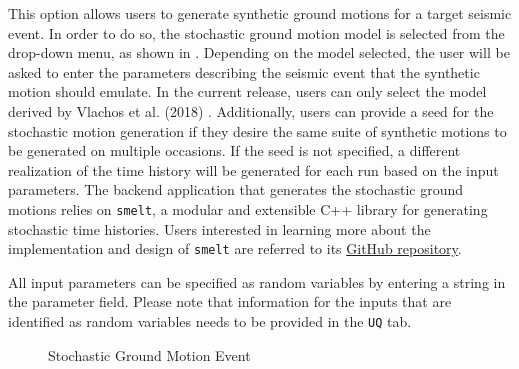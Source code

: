 This option allows users to generate synthetic ground motions for a
target seismic event. In order to do so, the stochastic ground motion
model is selected from the drop-down menu, as shown
in . Depending on the model selected, the
user will be asked to enter the parameters describing the seismic
event that the synthetic motion should emulate. In the current
release, users can only select the model derived by Vlachos et
al. (2018) \cite{vlachos2018predictive}. Additionally, users can
provide a seed for the stochastic motion generation if they desire the
same suite of synthetic motions to be generated on multiple occasions.
If the seed is not specified, a different realization of the time history
will be generated for each run based on the input parameters. The backend
application that generates the stochastic ground motions relies
on \texttt{smelt}, a modular and extensible C++ library for generating
stochastic time histories. Users interested in learning more about the
implementation and design of
\texttt{smelt} are referred to its
\href{https://github.com/NHERI-SimCenter/smelt}{GitHub repository}.

All input parameters can be specified as random variables by entering
a string in the parameter field. Please note that information for the
inputs that are identified as random variables needs to be provided in
the \texttt{UQ} tab.

\begin{figure}[!htbp]
  \caption{Stochastic Ground Motion Event}
  \label{fig:stochastic_loading}
\end{figure}